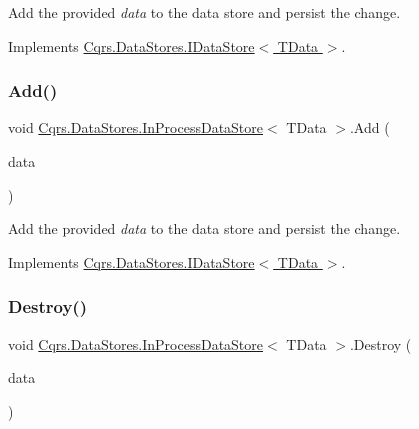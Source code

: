 Add the provided {\itshape data}  to the data store and persist the change. 



Implements \hyperlink{interfaceCqrs_1_1DataStores_1_1IDataStore_a114404daaf37fec9cc5547cd9a17858c_a114404daaf37fec9cc5547cd9a17858c}{Cqrs.\+Data\+Stores.\+I\+Data\+Store$<$ T\+Data $>$}.

\mbox{\label{classCqrs_1_1DataStores_1_1InProcessDataStore_ad62504e478f0a907c18ec4aa9b42703a_ad62504e478f0a907c18ec4aa9b42703a}} 
\subsubsection{\texorpdfstring{Add()}{Add()}\hspace{0.1cm}{\footnotesize\ttfamily [2/2]}}
{\footnotesize\ttfamily void \hyperlink{classCqrs_1_1DataStores_1_1InProcessDataStore}{Cqrs.\+Data\+Stores.\+In\+Process\+Data\+Store}$<$ T\+Data $>$.Add (\begin{DoxyParamCaption}\item[{I\+Enumerable$<$ T\+Data $>$}]{data }\end{DoxyParamCaption})}



Add the provided {\itshape data}  to the data store and persist the change. 



Implements \hyperlink{interfaceCqrs_1_1DataStores_1_1IDataStore_a906f3f2f80db7a549a4170eca4653e26_a906f3f2f80db7a549a4170eca4653e26}{Cqrs.\+Data\+Stores.\+I\+Data\+Store$<$ T\+Data $>$}.

\mbox{\label{classCqrs_1_1DataStores_1_1InProcessDataStore_a1fc7a3935f52087f3703b652e77f0b75_a1fc7a3935f52087f3703b652e77f0b75}} 
\subsubsection{\texorpdfstring{Destroy()}{Destroy()}}
{\footnotesize\ttfamily void \hyperlink{classCqrs_1_1DataStores_1_1InProcessDataStore}{Cqrs.\+Data\+Stores.\+In\+Process\+Data\+Store}$<$ T\+Data $>$.Destroy (\begin{DoxyParamCaption}\item[{T\+Data}]{data }\end{DoxyParamCaption})}



